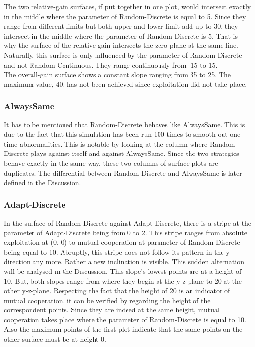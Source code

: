\documentclass{article}
\begin{document}
		The two relative-gain surfaces, if put together in one plot, would intersect exactly in the middle where the parameter of Random-Discrete is equal to 5.
		Since they range from different limits but both upper and lower limit add up to 30, they intersect in the middle where the parameter of Random-Discrete is 5.
		That is why the surface of the relative-gain intersects the zero-plane at the same line.
		Naturally, this surface is only influenced by the parameter of Random-Discrete and not Random-Continuous.
		They range continuously from -15 to 15.\\

		The overall-gain surface shows a constant slope ranging from 35 to 25.
		The maximum value, 40, has not been achieved since exploitation did not take place.\\


\subsubsection*{AlwaysSame}
		It has to be mentioned that Random-Discrete behaves like AlwaysSame.
		This is due to the fact that this simulation has been run 100 times to smooth out one-time abnormalities.
		This is notable by looking at the column where Random-Discrete plays against itself and against AlwaysSame.
		Since the two strategies behave exactly in the same way, these two columns of surface plots are duplicates.
		The differential between Random-Discrete and AlwaysSame is later defined in the Discussion.\\


\subsubsection*{Adapt-Discrete}
		In the surface of Random-Discrete against Adapt-Discrete, there is a stripe at the parameter of Adapt-Discrete being from 0 to 2.
		This stripe ranges from absolute exploitation at (0, 0) to mutual cooperation at parameter of Random-Discrete being equal to 10.
		Abruptly, this stripe does not follow its pattern in the y-direction any more.
		Rather a new inclination is visible.
		This sudden alternation will be analysed in the Discussion. 
		This slope's lowest points are at a height of 10.
		But, both slopes range from where they begin at the y-z-plane to 20 at the other y-z-plane.
		Respecting the fact that the height of 20 is an indicator of mutual cooperation, it can be verified by regarding the height of the correspondent points.
		Since they are indeed at the same height, mutual cooperation takes place where the parameter of Random-Discrete is equal to 10.
		Also the maximum points of the first plot indicate that the same points on the other surface must be at height 0.\\
\end{document}
